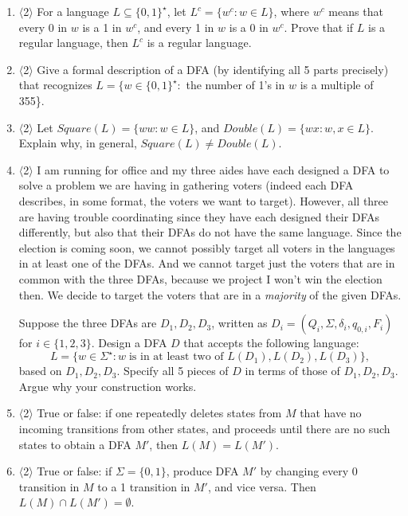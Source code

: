 \documentclass[a4paper,american,12pt]{book}
\newcommand{\Level}[1]{{\color{blue} $\langle$#1$\rangle$}}
\begin{document}
\begin{enumerate}
\item \Level{2} For a language $L \subseteq \{0,1\}^\star$, let $L^c = \{w^c : w \in L\}$, where $w^c$ means that every 0 in $w$ is a 1 in $w^c$, and every 1 in $w$ is a 0 in $w^c$.
Prove that if $L$ is a regular language, then $L^c$ is a regular language.

\item \Level{2} Give a formal description of a DFA (by identifying all 5 parts precisely) that recognizes $L = \{w \in \{0,1\}^\star :$ the number of 1's in $w$ is a multiple of 355\}.

\item  \label{ex2017fsquaredouble} \Level{2} Let $Square(L) = \{ ww : w \in L\}$, and $Double(L) = \{wx : w, x \in L \}$.
Explain why, in general, $Square(L) \ne Double(L)$.

\item \Level{2} I am running for office and my three aides have each designed a DFA to solve a problem we are having in gathering voters (indeed each DFA describes, in some format, the voters we want to target).
However, all three are having trouble coordinating since they have each designed their DFAs differently, but also that their DFAs do not have the same language.
Since the election is coming soon, we cannot possibly target all voters in the languages in at least one of the DFAs.
And we cannot target just the voters that are in common with the three DFAs, because we project I won't win the election then.
We decide to target the voters that are in a \emph{majority} of the given DFAs.

Suppose the three DFAs are $D_1, D_2, D_3$, written as $D_i = (Q_i, \Sigma, \delta_i, q_{0,i}, F_i)$ for $i \in \{1,2,3\}$.
Design a DFA $D$ that accepts the following language:
\[
L = \{ w \in \Sigma^\star : w\;\text{is in at least two of $L(D_1), L(D_2), L(D_3)$}\},
\]
based on $D_1, D_2, D_3$.
Specify all 5 pieces of $D$ in terms of those of $D_1, D_2, D_3$.
Argue why your construction works.

\item \Level{2} True or false: if one repeatedly deletes states from $M$ that have no incoming transitions from other states, and proceeds until there are no such states to obtain a DFA $M'$, then $L(M) = L(M')$.

\item \Level{2} True or false: if $\Sigma=\{0,1\}$, produce DFA $M'$ by changing every 0 transition in $M$ to a 1 transition in $M'$, and vice versa. Then $L(M) \cap L(M') = \emptyset$.


\end{enumerate}
\end{document}
